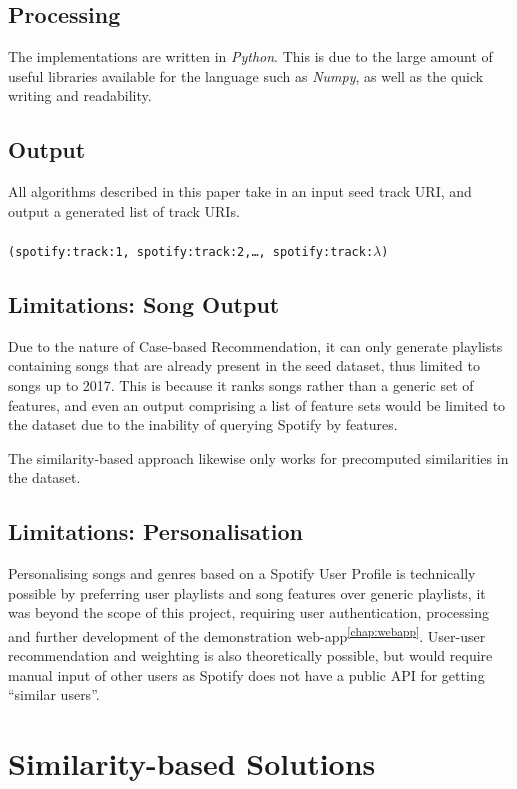 \documentclass[a4paper, 12pt]{report}
\begin{document}
\section{Processing}
The implementations are written in \emph{Python}.
This is due to the large amount of useful libraries available for the language such as \emph{Numpy}, as well as the quick 
writing and readability. 

\section{Output}
All algorithms described in this paper take in an input seed track URI, and output a generated list of track URIs.
\\
\\
\texttt{(spotify:track:1, spotify:track:2,\ldots, spotify:track:\(\lambda\))}

\section{Limitations: Song Output}\label{section:limsongs}
Due to the nature of Case-based Recommendation, it can only generate playlists containing songs that are already present in the seed dataset, 
thus limited to songs up to 2017.
This is because it ranks songs rather than a generic set of features, and even an output comprising a list of feature sets would be limited to the dataset
due to the inability of querying Spotify by features.

The similarity-based approach likewise only works for precomputed similarities in the dataset.

\section{Limitations: Personalisation}\label{section:limpersonalisation}
Personalising songs and genres based on a Spotify User Profile is technically possible by preferring user playlists and song features
over generic playlists, it was beyond the scope of this project, requiring user authentication, processing and further development of the demonstration web-app\textsuperscript{\ref{chap:webapp}}.
User-user recommendation and weighting is also theoretically possible, but would require manual input of other users as Spotify does not have a
public API for getting ``similar users''.



\chapter{Similarity-based Solutions}
\end{document}

